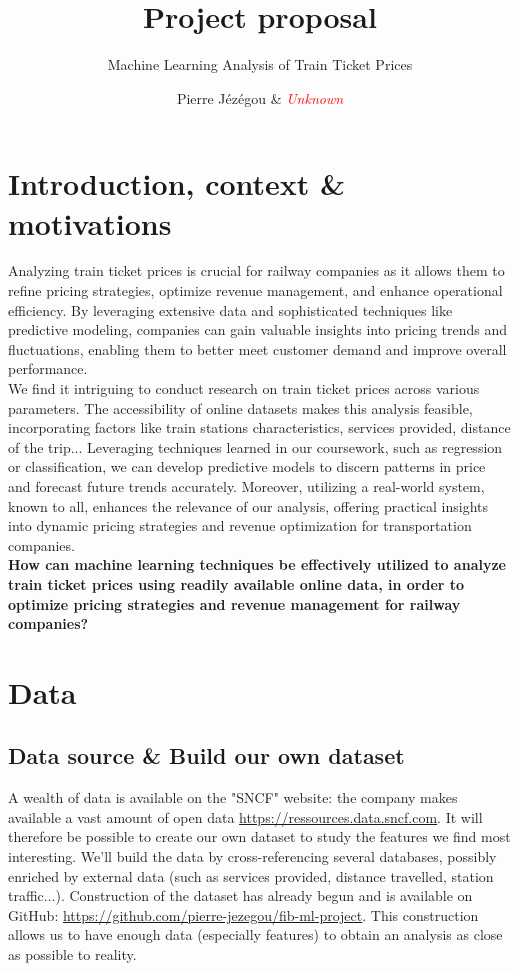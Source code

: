 \documentclass[10pt,a4paper,hidelinks]{article}
\title{Project proposal}
\subtitle{Machine Learning Analysis of Train Ticket Prices}
\date{}
\author{Pierre Jézégou \& \textcolor{red}{\textit{Unknown}}}
\begin{document}
\maketitle

\section{Introduction, context \& motivations}
Analyzing train ticket prices is crucial for railway companies as it allows them to refine pricing strategies, optimize revenue management, and enhance operational efficiency. By leveraging extensive data and sophisticated techniques like predictive modeling, companies can gain valuable insights into pricing trends and fluctuations, enabling them to better meet customer demand and improve overall performance.\\

We find it intriguing to conduct research on train ticket prices across various parameters. The accessibility of online datasets makes this analysis feasible, incorporating factors like train stations characteristics, services provided, distance of the trip... Leveraging techniques learned in our coursework, such as regression or classification, we can develop predictive models to discern patterns in price and forecast future trends accurately. Moreover, utilizing a real-world system, known to all, enhances the relevance of our analysis, offering practical insights into dynamic pricing strategies and revenue optimization for transportation companies.\\

\textbf{How can machine learning techniques be effectively utilized to analyze train ticket prices using readily available online data, in order to optimize pricing strategies and revenue management for railway companies?}

\section{Data}
\subsection{Data source \& Build our own dataset}
A wealth of data is available on the "SNCF" website: the company makes available a vast amount of open data \url{https://ressources.data.sncf.com}. It will therefore be possible to create our own dataset to study the features we find most interesting. We'll build the data by cross-referencing several databases, possibly enriched by external data (such as services provided, distance travelled, station traffic...). 
Construction of the dataset has already begun and is available on GitHub: \url{https://github.com/pierre-jezegou/fib-ml-project}.  This construction allows us to have enough data (especially features) to obtain an analysis as close as possible to reality.
\end{document}
